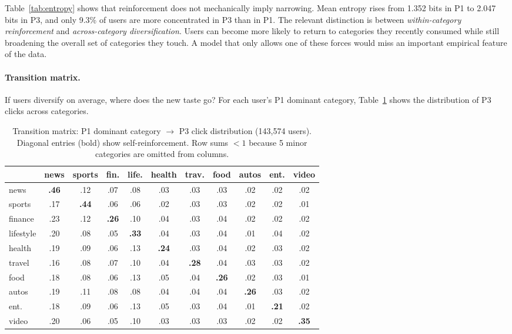 \documentclass[11pt]{article}
\begin{document}
Table~\ref{tab:entropy} shows that reinforcement does not mechanically imply narrowing. Mean entropy rises from 1.352 bits in P1 to 2.047 bits in P3, and only 9.3\% of users are more concentrated in P3 than in P1. The relevant distinction is between \emph{within-category reinforcement} and \emph{across-category diversification}. Users can become more likely to return to categories they recently consumed while still broadening the overall set of categories they touch. A model that only allows one of these forces would miss an important empirical feature of the data.
\paragraph{Transition matrix.} If users diversify on average, where does the new taste go? For each user's P1 dominant category, Table~\ref{tab:transition} shows the distribution of P3 clicks across categories.

\begin{table}[ht]
\centering
\caption{Transition matrix: P1 dominant category $\to$ P3 click distribution (143,574 users). Diagonal entries (bold) show self-reinforcement. Row sums $< 1$ because 5 minor categories are omitted from columns.}
\label{tab:transition}
\small
\setlength{\tabcolsep}{3.5pt}
\begin{tabular}{l|cccccccccc}
\toprule
& news & sports & fin. & life. & health & trav. & food & autos & ent. & video \\
\midrule
news & \textbf{.46} & .12 & .07 & .08 & .03 & .03 & .03 & .02 & .02 & .02 \\
sports & .17 & \textbf{.44} & .06 & .06 & .02 & .03 & .03 & .02 & .02 & .01 \\
finance & .23 & .12 & \textbf{.26} & .10 & .04 & .03 & .04 & .02 & .02 & .02 \\
lifestyle & .20 & .08 & .05 & \textbf{.33} & .04 & .03 & .04 & .01 & .04 & .02 \\
health & .19 & .09 & .06 & .13 & \textbf{.24} & .03 & .04 & .02 & .03 & .02 \\
travel & .16 & .08 & .07 & .10 & .04 & \textbf{.28} & .04 & .03 & .03 & .02 \\
food & .18 & .08 & .06 & .13 & .05 & .04 & \textbf{.26} & .02 & .03 & .01 \\
autos & .19 & .11 & .08 & .08 & .04 & .04 & .04 & \textbf{.26} & .03 & .02 \\
ent. & .18 & .09 & .06 & .13 & .05 & .03 & .04 & .01 & \textbf{.21} & .02 \\
video & .20 & .06 & .05 & .10 & .03 & .03 & .03 & .02 & .02 & \textbf{.35} \\
\bottomrule
\end{tabular}
\end{table}
\FloatBarrier
\end{document}
